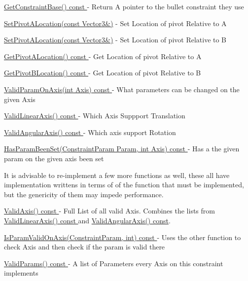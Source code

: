\begin{DoxyItemize}
\item \hyperlink{classphys_1_1TypedConstraint_ab3bd2baa58d3f0d812401cbf59159a8b}{GetConstraintBase() const }-\/ Return A pointer to the bullet constraint they use
\item \hyperlink{classphys_1_1TypedConstraint_aaa301fee77aa6e20ab202f604f0e9518}{SetPivotALocation(const Vector3\&)} -\/ Set Location of pivot Relative to A
\item \hyperlink{classphys_1_1TypedConstraint_aaa301fee77aa6e20ab202f604f0e9518}{SetPivotALocation(const Vector3\&)} -\/ Set Location of pivot Relative to B
\item \hyperlink{classphys_1_1TypedConstraint_af9827f1d4c7bcfb201d43d3dcf03cdfd}{GetPivotALocation() const }-\/ Get Location of pivot Relative to A
\item \hyperlink{classphys_1_1TypedConstraint_ad1d8e9e2ab17579bd6c13ee8c4acf20b}{GetPivotBLocation() const }-\/ Get Location of pivot Relative to B
\item \hyperlink{classphys_1_1TypedConstraint_af9f4c03dbba0d55e60dce341dbdc1105}{ValidParamOnAxis(int Axis) const }-\/ What parameters can be changed on the given Axis
\item \hyperlink{classphys_1_1TypedConstraint_af9d5a6630d5f384825388a1e73c88b3a}{ValidLinearAxis() const }-\/ Which Axis Suppport Translation
\item \hyperlink{classphys_1_1TypedConstraint_afd67483ff73a4b8ffef17c149b8a6cfa}{ValidAngularAxis() const }-\/ Which axis support Rotation
\item \hyperlink{classphys_1_1TypedConstraint_a849e7b91306f444cb8c73d52707a9521}{HasParamBeenSet(ConstraintParam Param, int Axis) const }-\/ Has a the given param on the given axis been set
\end{DoxyItemize}

It is advisable to re-\/implement a few more functions as well, these all have implementation writtens in terms of of the function that must be implemented, but the genericity of them may impede performance.
\begin{DoxyItemize}
\item \hyperlink{classphys_1_1TypedConstraint_a6db21f6c516be6c98d9fa21963f30445}{ValidAxis() const }-\/ Full List of all valid Axis. Combines the lists from \hyperlink{classphys_1_1TypedConstraint_af9d5a6630d5f384825388a1e73c88b3a}{ValidLinearAxis() const }and \hyperlink{classphys_1_1TypedConstraint_afd67483ff73a4b8ffef17c149b8a6cfa}{ValidAngularAxis() const}.
\item \hyperlink{classphys_1_1TypedConstraint_a57f6e5053357deb43dae26a85b050207}{IsParamValidOnAxis(ConstraintParam, int) const }-\/ Uses the other function to check Axis and then check if the param is valid there
\item \hyperlink{classphys_1_1TypedConstraint_ad061a210a8d870bd9be0ff01a5509549}{ValidParams() const }-\/ A list of Parameters every Axis on this constraint implements 
\end{DoxyItemize}

